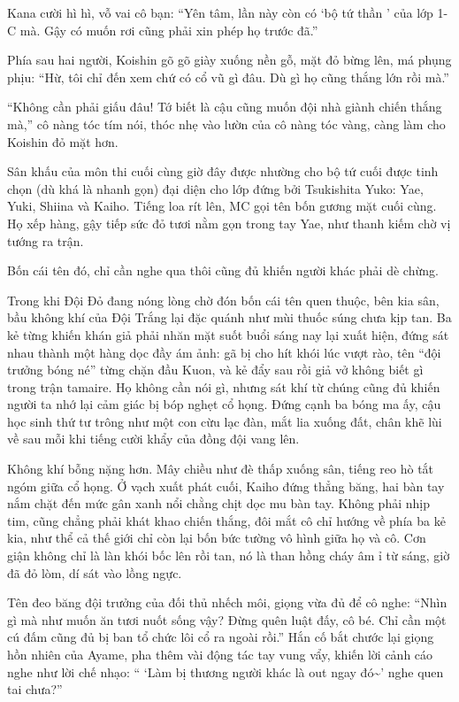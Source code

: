 \documentclass[../main.tex]{subfiles}
\begin{document}
Kana cười hì hì, vỗ vai cô bạn: ``Yên tâm, lần này còn có `bộ tứ thần ' của lớp 1-C mà. Gậy có muốn rơi cũng phải xin phép họ trước đã.''

Phía sau hai người, Koishin gõ gõ giày xuống nền gỗ, mặt đỏ bừng lên, má phụng phịu: ``Hừ, tôi chỉ đến xem chứ có cổ vũ gì đâu. Dù gì họ cũng thắng lớn rồi mà.''

``Không cần phải giấu đâu! Tớ biết là cậu cũng muốn đội nhà giành chiến thắng mà,'' cô nàng tóc tím nói, thóc nhẹ vào lườn của cô nàng tóc vàng, càng làm cho Koishin đỏ mặt hơn.

Sân khấu của môn thi cuối cùng giờ đây được nhường cho bộ tứ cuối được tinh chọn (dù khá là nhanh gọn) đại diện cho lớp đứng bởi Tsukishita Yuko: Yae, Yuki, Shiina và Kaiho. Tiếng loa rít lên, MC gọi tên bốn gương mặt cuối cùng.  Họ xếp hàng, gậy tiếp sức đỏ tươi nằm gọn trong tay Yae, như thanh kiếm chờ vị tướng ra trận.

Bốn cái tên đó, chỉ cần nghe qua thôi cũng đủ khiến người khác phải dè chừng.

Trong khi Đội Đỏ đang nóng lòng chờ đón bốn cái tên quen thuộc, bên kia sân, bầu không khí của Đội Trắng lại đặc quánh như mùi thuốc súng chưa kịp tan. Ba kẻ từng khiến khán giả phải nhăn mặt suốt buổi sáng nay lại xuất hiện, đứng sát nhau thành một hàng dọc đầy ám ảnh: gã bị cho hít khói lúc vượt rào, tên ``đội trưởng bóng né'' từng chặn đầu Kuon, và kẻ đẩy sau rồi giả vở không biết gì trong trận tamaire. Họ không cần nói gì, nhưng sát khí từ chúng cũng đủ khiến người ta nhớ lại cảm giác bị bóp nghẹt cổ họng. Đứng cạnh ba bóng ma ấy, cậu học sinh thứ tư trông như một con cừu lạc đàn, mắt lia xuống đất, chân khẽ lùi về sau mỗi khi tiếng cười khẩy của đồng đội vang lên.

Không khí bỗng nặng hơn. Mây chiều như đè thấp xuống sân, tiếng reo hò tắt ngóm giữa cổ họng. Ở vạch xuất phát cuối, Kaiho đứng thẳng băng, hai bàn tay nắm chặt đến mức gân xanh nổi chằng chịt dọc mu bàn tay. Không phải nhịp tim, cũng chẳng phải khát khao chiến thắng, đôi mắt cô chỉ hướng về phía ba kẻ kia, như thể cả thế giới chỉ còn lại bốn bức tường vô hình giữa họ và cô. Cơn giận không chỉ là làn khói bốc lên rồi tan, nó là than hồng cháy âm ỉ từ sáng, giờ đã đỏ lòm, dí sát vào lồng ngực.

Tên đeo băng đội trưởng của đối thủ nhếch môi, giọng vừa đủ để cô nghe: ``Nhìn gì mà như muốn ăn tươi nuốt sống vậy? Đừng quên luật đấy, cô bé. Chỉ cần một cú đấm cũng đủ bị ban tổ chức lôi cổ ra ngoài rồi.'' Hắn cố bắt chước lại giọng hồn nhiên của Ayame, pha thêm vài động tác tay vung vẩy, khiến lời cảnh cáo nghe như lời chế nhạo: `` `Làm bị thương người khác là out ngay đó\~{}' nghe quen tai chưa?''
\end{document}
